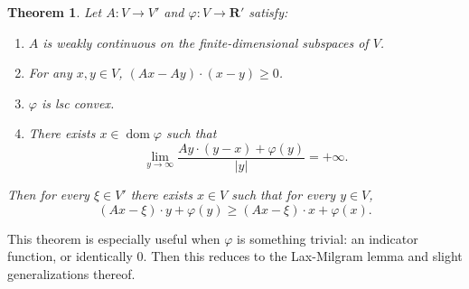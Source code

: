 \documentclass[reqno,11pt]{amsart}
\newcommand{\RR}{\mathbf{R}}
\DeclareMathOperator{\dom}{dom}
\newtheorem{theorem}{Theorem}[section]
\theoremstyle{definition}
\numberwithin{equation}{section}
\begin{document}
\begin{theorem}
Let $A: V \to V'$ and $\varphi: V \to \RR'$ satisfy:
\begin{enumerate}
\item $A$ is weakly continuous on the finite-dimensional subspaces of $V$.
\item For any $x, y \in V$, $(Ax - Ay) \cdot (x - y) \geq 0$.
\item $\varphi$ is lsc convex.
\item There exists $x \in \dom \varphi$ such that 
$$\lim_{y \to \infty} \frac{Ay \cdot (y - x) + \varphi(y)}{|y|} = +\infty.$$
\end{enumerate}
Then for every $\xi \in V'$ there exists $x \in V$ such that for every $y \in V$,
$$(Ax - \xi) \cdot y + \varphi(y) \geq (Ax - \xi) \cdot x + \varphi(x).$$
\end{theorem}

This theorem is especially useful when $\varphi$ is something trivial: an indicator function, or identically $0$.
Then this reduces to the Lax-Milgram lemma and slight generalizations thereof.



\printbibliography
\end{document}
